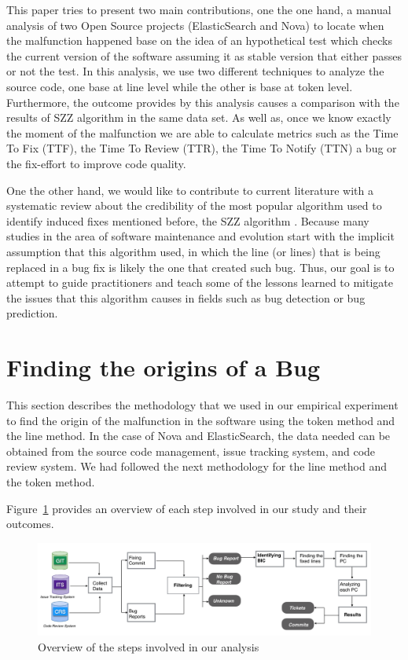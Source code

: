 \documentclass[10pt, conference]{IEEEtran}
\begin{document}
This paper tries to present two main contributions, one the one hand, a manual analysis of two Open Source projects (ElasticSearch and Nova) to locate when the malfunction happened base on the idea of an hypothetical test which checks the current version of the software assuming it as stable version that either passes or not the test. In this analysis, we use two different techniques to analyze the source code, one base at line level while the other is base at token level. Furthermore, the outcome provides by this analysis causes a comparison with the results of SZZ algorithm in the same data set. As well as, once we know exactly the moment of the malfunction we are able to calculate metrics such as the Time To Fix (TTF), the Time To Review (TTR), the Time To Notify (TTN) a bug or the fix-effort to improve code quality.

One the other hand, we would like to contribute to current literature with a systematic review about the credibility of the most popular algorithm used to identify induced fixes mentioned before, the SZZ algorithm \cite{sliwerski2005changes}. Because many studies in the area of software maintenance and evolution start with the implicit assumption that this algorithm used, in which the line (or lines) that is being replaced in a bug fix is likely the one that created such bug. Thus, our goal is to attempt to guide practitioners and teach some of the lessons learned to mitigate the issues that this algorithm causes in fields such as bug detection or bug prediction. 

\section{Finding the origins of a Bug}
\label{sec:finding}

This section describes the methodology that we used in our empirical experiment to find the origin of the malfunction in the software using the token method and the line method. In the case of Nova and ElasticSearch, the data needed can be obtained from the source code management, issue tracking system, and code review system. We had followed the next methodology for the line method and the token method.

Figure~\ref{fig:diagram} provides an overview of each step involved in our study and their outcomes.

\begin{figure}[ht]
\centering
\includegraphics[width=\columnwidth]{diagram.png}
\caption{Overview of the steps involved in our analysis }
\label{fig:diagram}       %
\end{figure}
\end{document}
